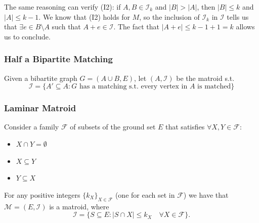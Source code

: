 The same reasoning can verify (I2): if $A,B\in\mathcal{I}_k$ and $|B|>|A|$, then $|B|\le k$ and
$|A|\le k-1$. We know that (I2) holds for $M$, so the inclusion of $\mathcal{I}_k$ in $\mathcal{I}$
tells us that $\exists e\in B\setminus A$ such that $A+e\in\mathcal{I}$. The fact that
$|A+e|\le k-1+1=k$ allows us to conclude.


\subsubsection{Half a Bipartite Matching}
Given a bibartite graph $ G = (A \cup B, E) $, let $ (A, \mathcal{I}) $ be the matroid s.t.
\[
  \mathcal{I} = \{A' \subseteq A : G \text{ has a matching s.t. every vertex in } A \text{ is matched}\}
\]

\subsubsection{Laminar Matroid}
Consider a family $ \mathcal{F} $ of subsets of the ground set $ E $ that satisfies $ \forall X, Y \in \mathcal{F} $:
\begin{itemize}
\item $ X \cap Y = \emptyset $
\item $ X \subseteq Y $
\item $ Y \subseteq X $
\end{itemize}
For any positive integers $ \{k_X\}_{X \in \mathcal{F}} $ (one for each set in $ \mathcal{F} $) we have that
$ \mathcal{M} = (E, \mathcal{I}) $ is a matroid, where
\[
  \mathcal{I} = \{S \subseteq E : |S \cap X| \leq k_X \quad \forall X \in \mathcal{F}\} .
\]

% 
